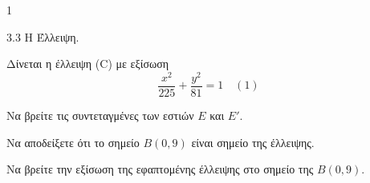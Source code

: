 \begin{ylh}{1}
    \item 3.3 Η Έλλειψη.
\end{ylh}
Δίνεται η έλλειψη (C) με εξίσωση
\[ \frac{x^2}{225} + \frac{y^2}{81} = 1 \quad (1) \]
\begin{alist}
\item Να βρείτε τις συντεταγμένες των εστιών $E$ και $E'$. 
\item Να αποδείξετε ότι το σημείο $B(0,9)$ είναι σημείο της έλλειψης. 
\item Να βρείτε την εξίσωση της εφαπτομένης έλλειψης στο σημείο της $B(0,9)$. 
\end{alist}